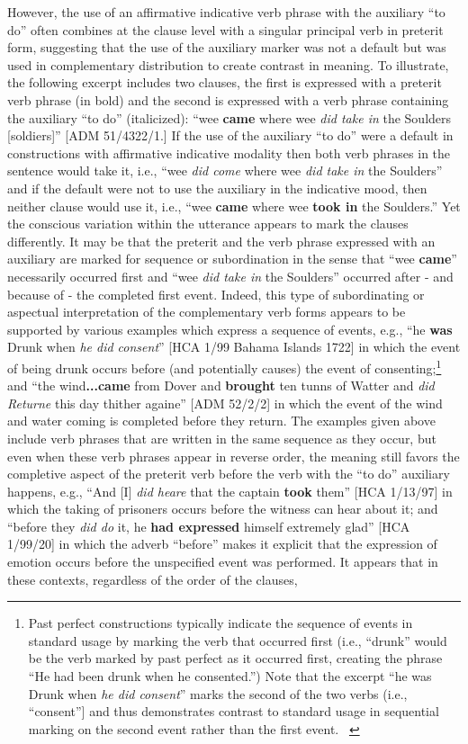 \begin{styleStandard}
However, the use of an affirmative indicative verb phrase with the auxiliary “to do” often combines at the clause level with a singular principal verb in preterit form, suggesting that the use of the auxiliary marker was not a default but was used in complementary distribution to create contrast in meaning. To illustrate, the following excerpt includes two clauses, the first is expressed with a preterit verb phrase (in bold) and the second is expressed with a verb phrase containing the auxiliary “to do” (italicized): “wee \textbf{came} where wee \textit{did take in} the Soulders [soldiers]” [ADM 51/4322/1.] If the use of the auxiliary “to do” were a default in constructions with affirmative indicative modality then both verb phrases in the sentence would take it, i.e., “wee \textit{did come} where wee \textit{did take in} the Soulders” and if the default were not to use the auxiliary in the indicative mood, then neither clause would use it, i.e., “wee \textbf{came} where wee \textbf{took in} the Soulders.” Yet the conscious variation within the utterance appears to mark the clauses differently. It may be that the preterit and the verb phrase expressed with an auxiliary are marked for sequence or subordination in the sense that “wee \textbf{came}” necessarily occurred first and “wee \textit{did take in} the Soulders” occurred after - and because of - the completed first event. Indeed, this type of subordinating or aspectual interpretation of the complementary verb forms appears to be supported by various examples which express a sequence of events, e.g., “he \textbf{was} Drunk when \textit{he did consent}” [HCA 1/99 Bahama Islands 1722] in which the event of being drunk occurs before (and potentially causes) the event of consenting;\footnote{ Past perfect constructions typically indicate the sequence of events in standard usage by marking the verb that occurred first (i.e., “drunk” would be the verb marked by past perfect as it occurred first, creating the phrase “He had been drunk when he consented.”) Note that the excerpt “he was Drunk when \textit{he did consent}” marks the second of the two verbs (i.e., “consent”] and thus demonstrates contrast to standard usage in sequential marking on the second event rather than the first event. \ } and “the wind\textbf{...came} from Dover and \textbf{brought} ten tunns of Watter and \textit{did Returne} this day thither againe” [ADM 52/2/2] in which the event of the wind and water coming is completed before they return. The examples given above include verb phrases that are written in the same sequence as they occur, but even when these verb phrases appear in reverse order, the meaning still favors the completive aspect of the preterit verb before the verb with the “to do” auxiliary happens, e.g., “And [I] \textit{did heare} that the captain \textbf{took }them” [HCA 1/13/97] in which the taking of prisoners occurs before the witness can hear about it; and “before they \textit{did do} it, he \textbf{had expressed }himself extremely glad” [HCA 1/99/20] in which the adverb “before” makes it explicit that the expression of emotion occurs before the unspecified event was performed. It appears that in these contexts, regardless of the order of the clauses, 
\end{styleStandard}
